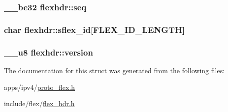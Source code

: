 \subsubsection[{\texorpdfstring{seq}{seq}}]{\setlength{\rightskip}{0pt plus 5cm}\+\_\+\+\_\+be32 flexhdr\+::seq}\hypertarget{structflexhdr_a1f437e344ae8752c7ea0586104bf67b4}{}\label{structflexhdr_a1f437e344ae8752c7ea0586104bf67b4}
\subsubsection[{\texorpdfstring{sflex\+\_\+id}{sflex_id}}]{\setlength{\rightskip}{0pt plus 5cm}char flexhdr\+::sflex\+\_\+id\mbox{[}{\bf F\+L\+E\+X\+\_\+\+I\+D\+\_\+\+L\+E\+N\+G\+TH}\mbox{]}}\hypertarget{structflexhdr_a3d0b687dac926a77cde8a5cc01f05533}{}\label{structflexhdr_a3d0b687dac926a77cde8a5cc01f05533}
\subsubsection[{\texorpdfstring{version}{version}}]{\setlength{\rightskip}{0pt plus 5cm}\+\_\+\+\_\+u8 flexhdr\+::version}\hypertarget{structflexhdr_a58658c0c3ac88c2ae21cf52cdbeaefd0}{}\label{structflexhdr_a58658c0c3ac88c2ae21cf52cdbeaefd0}


The documentation for this struct was generated from the following files\+:\begin{DoxyCompactItemize}
\item 
apps/ipv4/\hyperlink{proto__flex_8h}{proto\+\_\+flex.\+h}\item 
include/flex/\hyperlink{flex__hdr_8h}{flex\+\_\+hdr.\+h}\end{DoxyCompactItemize}
